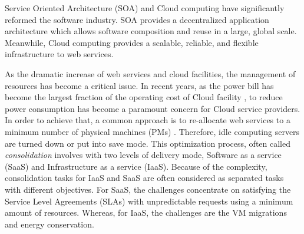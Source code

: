 



Service Oriented Architecture (SOA) and Cloud computing have significantly reformed the software industry. SOA provides a decentralized application architecture which allows software composition and reuse in a large, global scale. Meanwhile, Cloud computing provides  a scalable, reliable, and flexible infrastructure to web services. 



As the dramatic increase of web services and cloud facilities, the management of resources has become a critical issue. 
In recent years, as the power bill has become the largest fraction of the operating cost of Cloud facility \cite{Energy_6}, to reduce power consumption has become a paramount concern for Cloud service providers.
In order to achieve that, a common approach is to re-allocate web services to a minimum number of physical machines (PMs) \cite{Energy_7}. 
Therefore, idle computing servers are turned down or put into save mode. This optimization process, often called \textit{consolidation} involves with two levels of delivery mode, Software as a service (SaaS) and Infrastructure as a service (IaaS). Because of the complexity, consolidation tasks for IaaS and SaaS are often considered as separated tasks with different objectives. 
For SaaS, the challenges concentrate on satisfying the Service Level Agreements (SLAs) with unpredictable requests using a minimum amount of resources. Whereas, for IaaS, the challenges are the VM migrations and 
energy conservation.  

